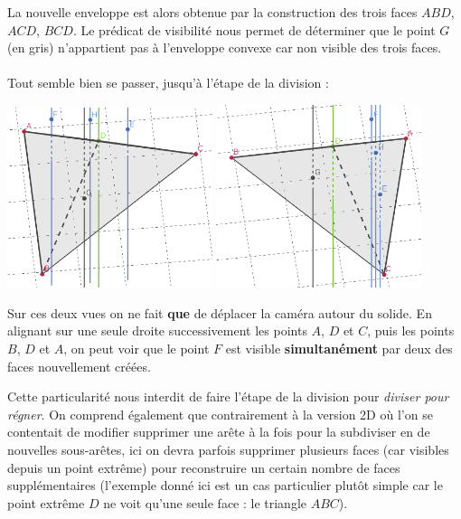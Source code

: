 \documentclass[]{article}
\begin{document}
La nouvelle enveloppe est alors obtenue par la construction des trois faces $ABD$, $ACD$, $BCD$. Le prédicat de visibilité nous permet de déterminer que le point $G$ (en gris) n'appartient pas à l'enveloppe convexe car non visible des trois faces.

\paragraph{}
Tout semble bien se passer, jusqu'à l'étape de la division :

\includegraphics[width=6cm]{qh3d/geogebra-export6.png}
\includegraphics[width=6cm]{qh3d/geogebra-export7.png}

Sur ces deux vues on ne fait \textbf{que} de déplacer la caméra autour du solide.
En alignant sur une seule droite successivement les points $A$, $D$ et $C$, puis les points $B$, $D$ et $A$, on peut voir que le point $F$ est visible \textbf{simultanément} par deux des faces nouvellement créées.

Cette particularité nous interdit de faire l'étape de la division pour \emph{diviser pour régner}. On comprend également que contrairement à la version 2D où l'on se contentait de modifier supprimer une arête à la fois pour la subdiviser en de nouvelles sous-arêtes, ici on devra parfois supprimer plusieurs faces (car visibles depuis un point extrême) pour reconstruire un certain nombre de faces supplémentaires (l'exemple donné ici est un cas particulier plutôt simple car le point extrême $D$ ne voit qu'une seule face : le triangle $ABC$).
\end{document}
